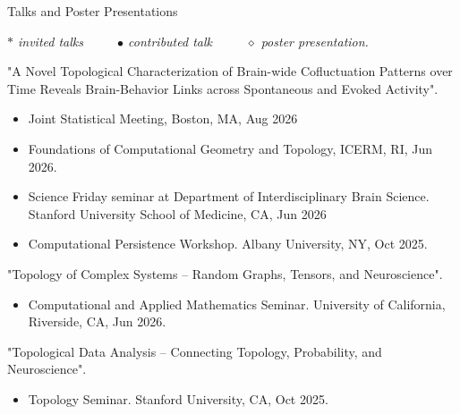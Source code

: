 \documentclass{resume} %
\begin{document}
\iffalse
\begin{rSection}{Talks and Poster Presentations}

\emph{$\ast$ invited talks $\qquad$ $\bullet$ contributed talk $\qquad$ $\diamond$ poster presentation.}

"A Novel Topological Characterization of Brain-wide Cofluctuation Patterns over Time Reveals Brain-Behavior Links across Spontaneous and Evoked Activity".
\begin{itemize}[noitemsep]
	\item Joint Statistical Meeting, Boston, MA, Aug 2026
    \item [$\diamond$] Foundations of Computational Geometry and Topology, ICERM, RI, Jun 2026.
    \item [$\ast$] Science Friday seminar at Department of Interdisciplinary Brain Science. Stanford University School of Medicine, CA, Jun 2026
    \item Computational Persistence Workshop. Albany University, NY, Oct 2025.
\end{itemize}

"Topology of Complex Systems -- Random Graphs, Tensors, and Neuroscience".
\begin{itemize}[noitemsep]
	\item[$\ast$] Computational and Applied Mathematics Seminar. University of California, Riverside, CA, Jun 2026.
\end{itemize}

"Topological Data Analysis -- Connecting Topology, Probability, and Neuroscience".
\begin{itemize}[noitemsep]
	\item[$\ast$] Topology Seminar. Stanford University, CA, Oct 2025.
\end{itemize}


\end{rSection}
\end{document}
